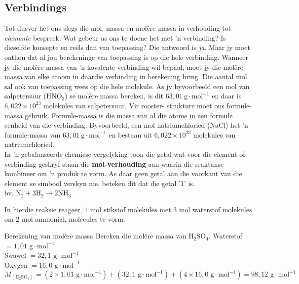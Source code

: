             \subsection*{Verbindings}
            \nopagebreak
Tot dusver het ons slegs die mol, massa en mol\^{e}re massa in verhouding tot \textsl{elemente} bespreek. Wat gebeur as ons te doene het met  'n verbinding? Is dieselfde konsepte en re\"{e}ls dan van toepassing? Die antwoord is \textsl{ja}. Maar jy moet onthou dat al jou berekeninge van toepassing is op die hele verbinding. Wanneer jy die mol\^{e}re massa van  'n kovalente verbinding wil bepaal, moet jy die mol\^{e}re massa van elke atoom in daardie verbinding in berekening bring. Die aantal mol sal ook van toepassing wees op die hele molekule. As jy byvoorbeeld een mol van salpetersuur ($\text{HNO}_{3}$) se molêre massa bereken, is dit $63,01~\text{g}\cdot{\text{mol}}^{-1}$ en daar is $6,022 \times 10^{23}$ molekules van salpetersuur. Vir rooster- strukture moet ons formule-massa gebruik. Formule-massa is die massa van al die atome in een formule eenheid van die verbinding. Byvoorbeeld, een mol natriumchloried ($\text{NaCl}$) het  'n formule-massa van  $63,01~\text{g}\cdot{\text{mol}}^{-1}$ en bestaan uit $6,022 \times 10^{23}$ molekules van natriumchloried.\\
In  'n gebalanseerde chemiese vergelyking toon die getal wat voor die element of verbinding geskryf staan die \textbf{mol-verhouding} aan  waarin die reaktanse kombineer om  'n produk te vorm. As daar geen getal aan die voorkant van die element se simbool verskyn nie, beteken dit dat die getal '1' is.\\
      \label{m38717*id278442}bv. ${\text{N}}_{2}+3{\text{H}}_{2}\to 2\text{N}{\text{H}}_{3}$\par 
      \label{m38717*id278488}In hierdie reaksie reageer, $1$ mol stikstof molekules met $3$ mol waterstof molekules om $2$ mol  ammoniak molecules te vorm.
\label{m38717*secfhsst!!!underscore!!!id566}
      \begin{wex}{Berekening van mol\^{e}re massa}{
      \label{m38717*probfhsst!!!underscore!!!id567}
      \label{m38717*id278505}Bereken die molêre massa van $\text{H}_{2}\text{SO}_{4}$.
      }
{
Waterstof $=1,01 \text{ g} \cdot \text{mol}^{-1}$ \\ 
Swawel $=32,1\text{ g} \cdot \text{mol}^{-1}$ \\
Oxygen $=16,0 \text{ g} \cdot \text{mol}^{-1}$ 
      \label{m38717*id278632}\nopagebreak\noindent{}
    \begin{equation*}
    {M}_{(\text{H}_{2}\text{SO}_{4})}=(2 \times 1,01 \text{ g} \cdot \text{mol}^{-1}) + (32,1 \text{ g} \cdot \text{mol}^{-1}) + (4 \times 16,0 \text{ g} \cdot \text{mol}^{-1} ) = 98,12 \text{ g} \cdot \text{mol}^{-1}
      \end{equation*}
}
    \end{wex}
    \noindent


